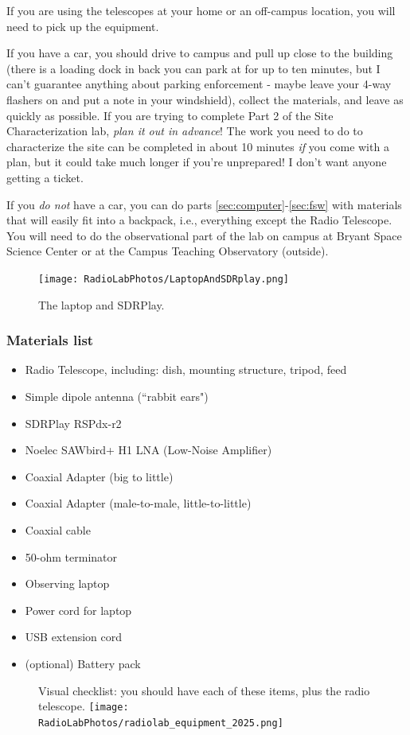 \documentclass[11pt]{article}
\begin{document}
If you are using the telescopes at your home or an off-campus location, you will need to pick up
the equipment.

If you have a car, you should drive to campus and pull up close to the building
(there is a loading dock in back you can park at for up to ten minutes, but I can't guarantee
anything about parking enforcement - maybe leave your 4-way flashers on and put a note in your windshield),
collect the materials, and leave as quickly as possible.
If you are trying to complete Part 2 of the Site Characterization lab, \emph{plan it out in advance}!
The work you need to do to characterize the site can be completed in about 10 minutes \emph{if}
you come with a plan, but it could take much longer if you're unprepared!  I don't want anyone getting a ticket.

If you \emph{do not} have a car, you can do parts \ref{sec:computer}-\ref{sec:fsw}
with materials that will easily fit into a backpack, i.e., everything except the Radio Telescope.
You will need to do the observational part of the lab on campus at Bryant Space Science Center or at
the Campus Teaching Observatory (outside).


\begin{figure}[h]
    \centering
    \texttt{[image: RadioLabPhotos/LaptopAndSDRplay.png]}
    \caption{The laptop and SDRPlay.}
\end{figure}

\clearpage
\subsubsection{Materials list}
\begin{itemize}
    \item Radio Telescope, including: dish, mounting structure, tripod, feed
    \item Simple dipole antenna (``rabbit ears")
    \item SDRPlay RSPdx-r2
    \item Noelec SAWbird+ H1 LNA (Low-Noise Amplifier)
    \item Coaxial Adapter (big to little)
    \item Coaxial Adapter (male-to-male, little-to-little)
    \item Coaxial cable
    \item 50-ohm terminator
    \item Observing laptop
    \item Power cord for laptop
    \item USB extension cord
    \item (optional) Battery pack
\end{itemize}
\begin{figure}[h]
    \centering
    \label{fig:radiolab_equipment_2025}
    Visual checklist: you should have each of these items, plus the radio telescope.
    \texttt{[image: RadioLabPhotos/radiolab\_equipment\_2025.png]}
\end{figure}
\end{document}
